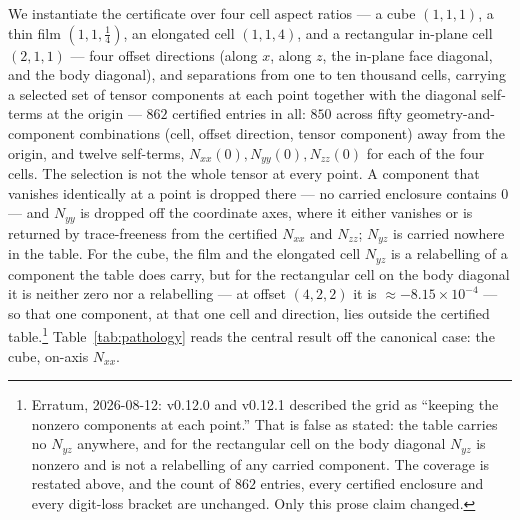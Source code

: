 \documentclass[11pt]{amsart}
\theoremstyle{plain}
\theoremstyle{definition}
\theoremstyle{remark}
\begin{document}
We instantiate the certificate over four cell aspect ratios --- a cube
$(1,1,1)$, a thin film $(1,1,\tfrac14)$, an elongated cell $(1,1,4)$, and a
rectangular in-plane cell $(2,1,1)$ --- four offset directions (along $x$, along
$z$, the in-plane face diagonal, and the body diagonal), and separations from
one to ten thousand cells, carrying a selected set of tensor components at each
point together with the diagonal self-terms at the origin --- $862$ certified
entries in all: $850$ across fifty geometry-and-component combinations (cell,
offset direction, tensor component) away from the origin, and twelve self-terms,
$N_{xx}(0),N_{yy}(0),N_{zz}(0)$ for each of the four cells. The selection is not
the whole tensor at every point. A component that vanishes identically at a
point is dropped there --- no carried enclosure contains $0$ --- and $N_{yy}$ is
dropped off the coordinate axes, where it either vanishes or is returned by
trace-freeness from the certified $N_{xx}$ and $N_{zz}$; $N_{yz}$ is carried
nowhere in the table. For the cube, the film and the elongated cell
$N_{yz}$ is a relabelling of a component the table does carry, but for the
rectangular cell on the body diagonal it is neither zero nor a relabelling ---
at offset $(4,2,2)$ it is $\approx-8.15\times10^{-4}$ --- so that one component,
at that one cell and direction, lies outside the certified
table.\footnote{Erratum, 2026-08-12: v0.12.0 and v0.12.1 described the
grid as ``keeping the nonzero components at each point.'' That is false as
stated: the table carries no $N_{yz}$ anywhere, and for the rectangular cell on
the body diagonal $N_{yz}$ is nonzero and is not a relabelling of any carried
component. The coverage is restated above, and the count of $862$ entries, every
certified enclosure and every digit-loss bracket are unchanged. Only this prose
claim changed.}
Table~\ref{tab:pathology} reads the central result off the canonical case: the
cube, on-axis $N_{xx}$.
\end{document}
